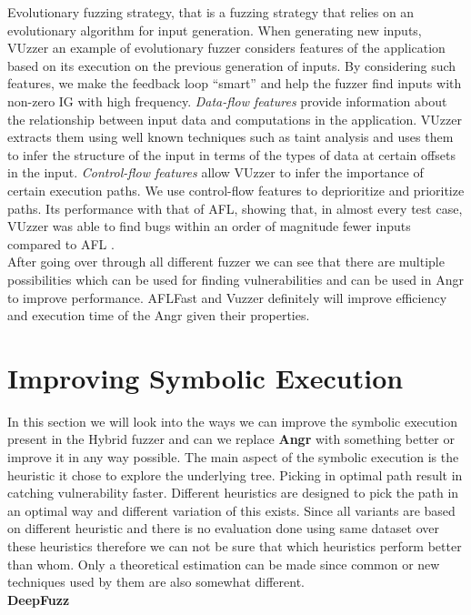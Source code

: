 \documentclass[a4paper, 11pt]{article}
\begin{document}
Evolutionary fuzzing strategy, that is a fuzzing strategy that relies on an evolutionary algorithm for input generation. When generating new inputs, VUzzer an example of evolutionary fuzzer considers features of the application based on its execution on the previous generation of inputs. By considering such features, we make the feedback loop ``smart'' and help the fuzzer find inputs with non-zero IG with high frequency. \emph{Data-flow features} provide information about the relationship between input data and computations in the application. VUzzer extracts them using well known techniques such as taint analysis and uses them to infer the structure of the input in terms of the types of data at certain
offsets in the input. \emph{Control-flow features} allow VUzzer to infer the importance of certain execution paths. We use control-flow features to deprioritize and prioritize paths. Its performance with that of AFL, showing that, in almost every test case, VUzzer was
able to find bugs within an order of magnitude fewer inputs
compared to AFL \cite{vuzzer}.\\

After going over through all different fuzzer we can see that there are multiple possibilities which can be used for finding vulnerabilities and can be used in Angr to improve performance. AFLFast and Vuzzer definitely will improve efficiency and execution time of the Angr given their properties.
 
\section*{Improving Symbolic Execution}
In this section we will look into the ways we can improve the symbolic execution present in the Hybrid fuzzer and can we replace \textbf{Angr} with something better or improve it in any way possible. The main aspect of the symbolic execution is the heuristic it chose to explore the underlying tree. Picking in optimal path result in catching vulnerability faster. Different heuristics are designed to pick the path in an optimal way and different variation of this exists. Since all variants are based on different heuristic and there is no evaluation done using same dataset over these heuristics therefore we can not be sure that which heuristics perform better than whom. Only a theoretical estimation can be made since common or new techniques used by them are also somewhat different.\\

\noindent
\textbf{DeepFuzz}
  
\end{document}
